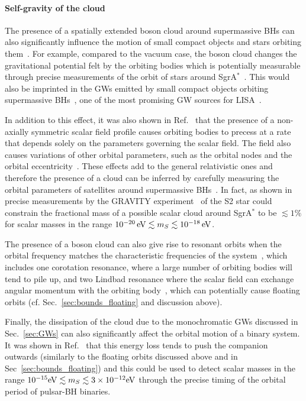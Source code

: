 \documentclass[11pt]{article}
\numberwithin{equation}{section} %
\begin{document}
\paragraph{Self-gravity of the cloud}
The presence of a spatially extended boson cloud around supermassive BHs can also significantly influence the motion of small compact objects and stars orbiting them~\cite{Ferreira:2017pth,Hannuksela:2018izj,Bar:2019pnz,Amorim:2019hwp}. For example, compared to the vacuum case, the boson cloud changes the gravitational potential felt by the orbiting bodies which is potentially measurable through precise measurements of the orbit of stars around SgrA$^*$~\cite{Ferreira:2017pth,Bar:2019pnz,Amorim:2019hwp}. This would also be imprinted in the GWs emitted by small compact objects orbiting supermassive BHs~\cite{Ferreira:2017pth,Hannuksela:2018izj},  one of the most promising GW sources for LISA~\cite{Audley:2017drz}.

In addition to this effect, it was also shown in Ref.~\cite{Ferreira:2017pth} that the presence of a non-axially symmetric scalar field profile causes orbiting bodies to precess at a rate that depends solely on the parameters governing the scalar field. The field also causes variations of other orbital parameters, such as the orbital nodes and the orbital eccentricity~\cite{Ferreira:2017pth,Amorim:2019hwp}. These effects add to the general relativistic ones and therefore the presence of a cloud can be inferred by carefully measuring the orbital parameters of satellites around supermassive BHs~\cite{Ferreira:2017pth,Amorim:2019hwp}. In fact, as shown in~\cite{Amorim:2019hwp} precise measurements by the GRAVITY experiment~\cite{GRAVITY} of the S2 star could constrain the fractional mass of a possible scalar cloud around SgrA$^*$ to be $\lesssim 1\%$ for scalar masses in the range $10^{-20}\, {\rm eV} \lesssim m_S\lesssim 10^{-18}\, {\rm eV}$. 

The presence of a boson cloud can also give rise to resonant orbits when the orbital frequency matches the characteristic frequencies of the system~\cite{Ferreira:2017pth}, which includes one corotation resonance, where a large number of orbiting bodies will tend to pile up, and two Lindbad resonance where the scalar field can exchange angular momentum with the orbiting body~\cite{Ferreira:2017pth}, which can potentially cause floating orbits (cf. Sec.~\ref{sec:bounds_floating} and discussion above).

Finally, the dissipation of the cloud due to the monochromatic GWs discussed in Sec.~\ref{sec:GWs} can also significantly affect the orbital motion of a binary system. It was shown in Ref.~\cite{Kavic:2019cgk} that this energy loss tends to push the companion outwards (similarly to the floating orbits discussed above and in Sec~\ref{sec:bounds_floating}) and this could be used to detect scalar masses in the range $10^{-15}{\rm eV}\lesssim m_S\lesssim 3\times 10^{-12}{\rm eV}$ through the precise timing of the orbital period of pulsar-BH binaries.
\end{document}
